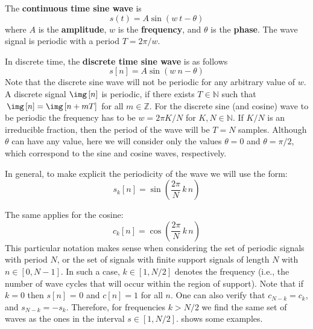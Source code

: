 
The {\bf continuous time sine wave} is
\begin{equation}
	s\left(t\right) = A \sin\left(w ~t - \theta \right)
\end{equation}
where $A$ is the {\bf amplitude}, $w$ is the {\bf frequency}, and $\theta$ is the {\bf phase}. The wave signal is periodic with a period $T=2 \pi / w$.


In discrete time, the {\bf discrete time sine wave} is as follows
\begin{equation}
	s\left[n\right] = A \sin\left(w ~n  - \theta \right)
\end{equation}
Note that the discrete sine wave will not be periodic for any arbitrary value of $w$. A discrete signal $\img \left[n\right]$ is periodic, if there exists $T \in \mathbb{N}$ such that $\img \left[n\right] = \img \left[n+mT\right]$ for all $m \in \mathbb{Z}$. For the discrete sine (and cosine) wave to be periodic the frequency has to be $w = 2 \pi K / N$ for $K,N \in \mathbb{N}$. If $K/N$ is an irreducible fraction, then the period of the wave will be $T = N$ samples. Although $\theta$ can have any value, here we will consider only the values $\theta=0$ and $\theta = \pi/2$, which correspond to the sine and cosine waves, respectively.


In general, to make explicit the periodicity of the wave we will use the form:
\begin{equation}
	s_k\left[n\right] = \sin\left( \frac{2 \pi}{N} \, k \, n \right)
\end{equation}

The same applies for the cosine:
\begin{equation}
	c_k\left[n\right] = \cos\left(\frac{2 \pi}{N} \,k\,n \right)
\end{equation}
This particular notation makes sense when considering the set of periodic signals with period $N$, or the set of signals with finite support signals of length $N$ with $n \in \left[0, N-1\right]$. In such a case, $k \in \left[1, N/2\right]$ denotes the frequency (i.e., the number of wave cycles that will occur within the region of support). Note that if $k=0$ then $s\left[n\right]$ = 0 and $c\left[n\right]=1$ for all $n$. One can also verify that $c_{N-k} = c_k$, and $s_{N-k} = -s_k$. Therefore, for frequencies $k>N/2$ we find the same set of waves as the ones in the interval $s \in \left[1, N/2\right]$. \Fig{\ref{fig:contsignal}} shows some examples.

